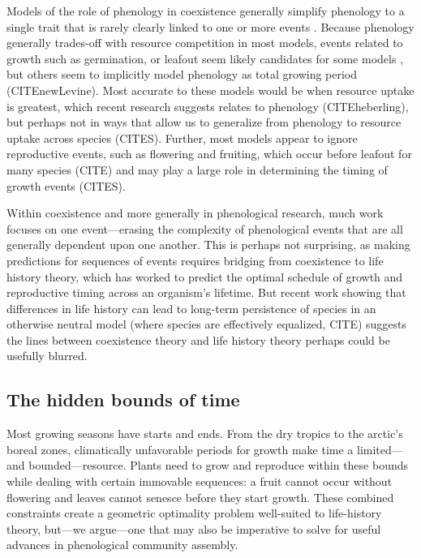 \documentclass[11pt]{article}
\begin{document}
Models of the role of phenology in coexistence generally simplify phenology to a single trait that is rarely clearly linked to one or more events \citep[even when studied with empirical data][]{godoy2014} . Because phenology generally trades-off with resource competition in most models, events related to growth such as germination, or leafout seem likely candidates for some models \citep[e.g.,][]{godoy2014,memegan2021}, but others seem to implicitly model phenology as total growing period (CITEnewLevine). Most accurate to these models would be when resource uptake is greatest, which recent research suggests relates to phenology (CITEheberling), but perhaps not in ways that allow us to generalize from phenology to resource uptake across species (CITES). Further, most models appear to ignore reproductive events, such as flowering and fruiting, which occur before leafout for many species (CITE) and may play a large role in determining the timing of growth events (CITES). 

Within coexistence and more generally in phenological research, much work focuses on one event---erasing the complexity of phenological events that are all generally dependent upon one another. This is perhaps not surprising, as making predictions for sequences of events requires bridging from coexistence to life history theory, which has worked to predict the optimal schedule of growth and reproductive timing across an organism's lifetime. But recent work showing that differences in life history can lead to long-term persistence of species in an otherwise neutral model (where species are effectively equalized, CITE) suggests the lines between coexistence theory and life history theory perhaps could be usefully blurred. 


\subsection*{The hidden bounds of time} 

Most growing seasons have starts and ends. From the dry tropics to the arctic's boreal zones, climatically unfavorable periods for growth make time a limited---and bounded---resource. Plants need to grow and reproduce within these bounds while dealing with certain immovable sequences: a fruit cannot occur without flowering and leaves cannot senesce before they start growth. These combined constraints create a geometric optimality problem well-suited to life-history theory, but---we argue---one that may also be imperative to solve for useful advances in phenological community assembly. %
\end{document}
